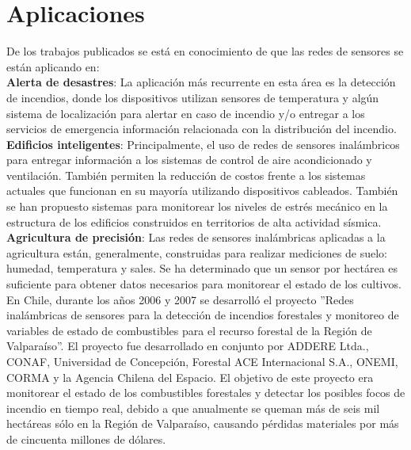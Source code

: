 
\section{Aplicaciones}
De los trabajos publicados se está en conocimiento de que las redes de sensores se están aplicando en\cite{WileyWSN}: \\

\textbf{Alerta de desastres}: La aplicación más recurrente en esta área es la detección de incendios, donde los dispositivos utilizan sensores de temperatura y algún sistema de localización para alertar en caso de incendio y/o entregar a los servicios de emergencia información relacionada con la distribución del incendio.\\

\textbf{Edificios inteligentes}: Principalmente, el uso de redes de sensores inalámbricos para entregar información a los sistemas de control de aire acondicionado y ventilación. También permiten la reducción de costos frente a los sistemas actuales que funcionan en su mayoría utilizando dispositivos cableados. También se han propuesto sistemas para monitorear los niveles de estrés mecánico en la estructura de los edificios construidos en territorios de alta actividad sísmica.\\

\textbf{Agricultura de precisión}: Las redes de sensores inalámbricas aplicadas a la agricultura están, generalmente, construidas para realizar mediciones de suelo: humedad, temperatura y sales. Se ha determinado que un sensor por hectárea es suficiente para obtener datos necesarios para monitorear el estado de los cultivos.\\


En Chile, durante los años 2006 y 2007 se desarrolló el proyecto ''Redes inalámbricas de sensores para la detección de incendios forestales y monitoreo de variables de estado de combustibles para el recurso forestal de la Región de Valparaíso''\cite{ProyectoForestal}. El proyecto fue desarrollado en conjunto por ADDERE Ltda., CONAF, Universidad de Concepción, Forestal ACE Internacional S.A., ONEMI, CORMA y la Agencia Chilena del Espacio. El objetivo de este proyecto era monitorear el estado de los combustibles forestales y detectar los posibles focos de incendio en tiempo real, debido a que anualmente se queman más de seis mil hectáreas sólo en la Región de Valparaíso, causando pérdidas materiales por más de cincuenta millones de dólares.\\

